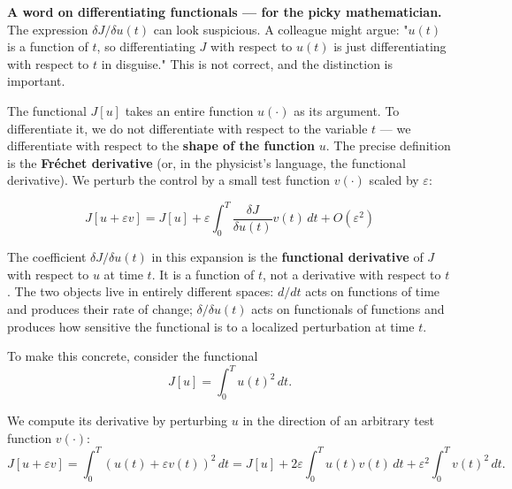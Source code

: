 \documentclass{article}
\begin{document}
\begin{mathrequirementsbox}
\textbf{A word on differentiating functionals — for the picky mathematician.} The expression $\delta J / \delta u(t)$ can look suspicious. A colleague might argue: "$u(t)$ is a function of $t$, so differentiating $J$ with respect to $u(t)$ is just differentiating with respect to $t$ in disguise." This is not correct, and the distinction is important.

The functional $J[u]$ takes an entire function $u(\cdot)$ as its argument. To differentiate it, we do not differentiate with respect to the variable $t$ — we differentiate with respect to the \textbf{shape of the function} $u$. The precise definition is the \textbf{Fréchet derivative} (or, in the physicist's language, the functional derivative). We perturb the control by a small test function $v(\cdot)$ scaled by $\varepsilon$:

$$J[u + \varepsilon v] = J[u] + \varepsilon \int_0^T \frac{\delta J}{\delta u(t)} v(t)\, dt + O(\varepsilon^2)$$

The coefficient $\delta J / \delta u(t)$ in this expansion is the \textbf{functional derivative} of $J$ with respect to $u$ at time $t$. It is a function of $t$, not a derivative with respect to $t$. The two objects live in entirely different spaces: $d/dt$ acts on functions of time and produces their rate of change; $\delta / \delta u(t)$ acts on functionals of functions and produces how sensitive the functional is to a localized perturbation at time $t$.





To make this concrete, consider the functional
\[
J[u] = \int_0^T u(t)^2 \, dt.
\]

We compute its derivative by perturbing $u$ in the direction of an arbitrary test function $v(\cdot)$:
\[
J[u + \varepsilon v]
= \int_0^T (u(t) + \varepsilon v(t))^2 \, dt
= J[u] + 2\varepsilon \int_0^T u(t)v(t)\,dt + \varepsilon^2 \int_0^T v(t)^2\,dt.
\]


\end{mathrequirementsbox}
\end{document}
